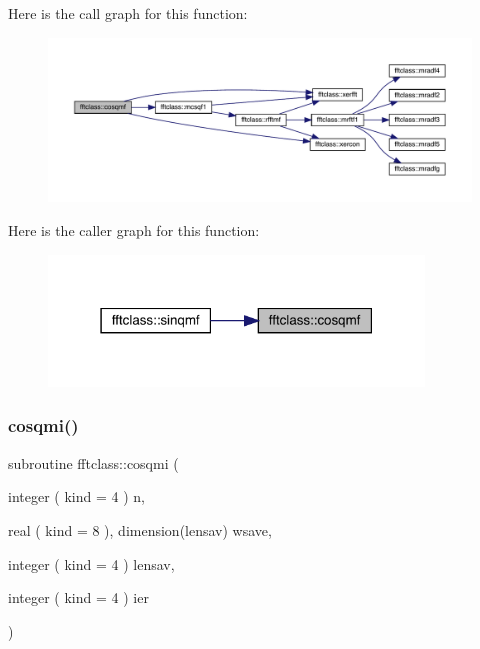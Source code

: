 Here is the call graph for this function\+:\nopagebreak
\begin{figure}[H]
\begin{center}
\leavevmode
\includegraphics[width=350pt]{namespacefftclass_a48467d0cccf9f7f93786f4997fe714f5_cgraph}
\end{center}
\end{figure}
Here is the caller graph for this function\+:\nopagebreak
\begin{figure}[H]
\begin{center}
\leavevmode
\includegraphics[width=283pt]{namespacefftclass_a48467d0cccf9f7f93786f4997fe714f5_icgraph}
\end{center}
\end{figure}
\mbox{\label{namespacefftclass_a9851ac46e48072ac6c85e3c574a10dc5}} 
\subsubsection{\texorpdfstring{cosqmi()}{cosqmi()}}
{\footnotesize\ttfamily subroutine fftclass\+::cosqmi (\begin{DoxyParamCaption}\item[{integer ( kind = 4 )}]{n,  }\item[{real ( kind = 8 ), dimension(lensav)}]{wsave,  }\item[{integer ( kind = 4 )}]{lensav,  }\item[{integer ( kind = 4 )}]{ier }\end{DoxyParamCaption})}

